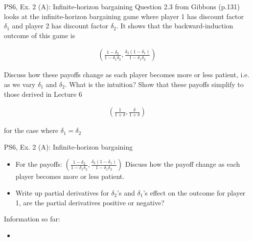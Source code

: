 \begin{frame}{PS6, Ex. 2 (A): Infinite-horizon bargaining}
Question 2.3 from Gibbons (p.131) looks at the infinite-horizon bargaining game where player 1 has discount factor $\delta_1$ and player 2 has discount factor $\delta_2$. It shows that the backward-induction outcome of this game is

\begin{align}
    \left( \frac{1-\delta_2}{1-\delta_1\delta_2},\frac{\delta_2(1-\delta_1)}{1-\delta_1\delta_2}\right)
\end{align}

Discuss how these payoffs change as each player becomes more or less patient, i.e. as we vary $\delta_1$ and $\delta_2$. What is the intuition? Show that these payoffs simplify to those derived in Lecture 6

\begin{align}
\left(\frac{1}{1+\delta},\frac{\delta}{1+\delta}\right)
\end{align}

for the case where $\delta_1=\delta_2$
\vfill\null
\end{frame}


\begin{frame}{PS6, Ex. 2 (A): Infinite-horizon bargaining}
    \begin{itemize}
    \item[Part one:] For the payoffs: $ \left( \frac{1-\delta_2}{1-\delta_1\delta_2},\frac{\delta_2(1-\delta_1)}{1-\delta_1\delta_2}\right)$ Discuss how the payoff change as each player becomes more or less patient.
    \end{itemize}
    \vfill\null
  \begin{multicols}{2}
    \begin{itemize}
      \item[(Step a)] Write up partial derivatives for $\delta_2$'s and $\delta_1$'s effect on the outcome for player 1, are the partial derivatives positive or negative?
      \end{itemize}
    \vfill\null \columnbreak
    Information so far:
    \begin{itemize}
    \item[]
    \end{itemize}
    \vfill\null
  \end{multicols}
    \vfill\null
\end{frame}

